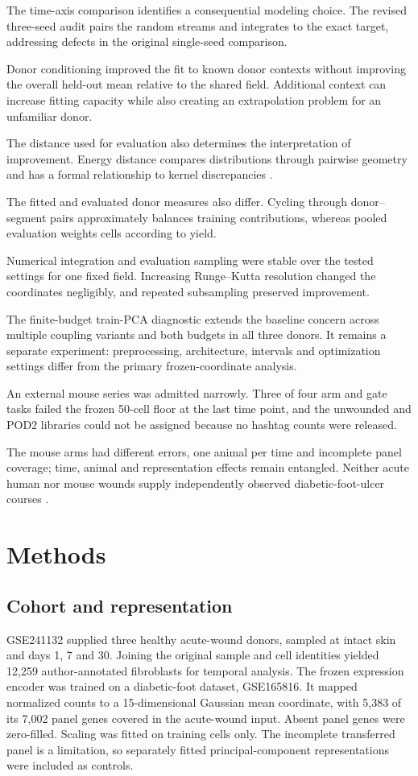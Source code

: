 \documentclass[10pt,a4paper]{article}
\begin{document}
The time-axis comparison identifies a consequential modeling choice. The revised three-seed audit pairs the random streams and integrates to the exact target, addressing defects in the original single-seed comparison.

Donor conditioning improved the fit to known donor contexts without improving the overall held-out mean relative to the shared field. Additional context can increase fitting capacity while also creating an extrapolation problem for an unfamiliar donor.

The distance used for evaluation also determines the interpretation of improvement. Energy distance compares distributions through pairwise geometry and has a formal relationship to kernel discrepancies \citep{szekely2013,sejdinovic2013}.

The fitted and evaluated donor measures also differ. Cycling through donor--segment pairs approximately balances training contributions, whereas pooled evaluation weights cells according to yield.

Numerical integration and evaluation sampling were stable over the tested settings for one fixed field. Increasing Runge--Kutta resolution changed the coordinates negligibly, and repeated subsampling preserved improvement.

The finite-budget train-PCA diagnostic extends the baseline concern across multiple coupling variants and both budgets in all three donors. It remains a separate experiment: preprocessing, architecture, intervals and optimization settings differ from the primary frozen-coordinate analysis.

An external mouse series was admitted narrowly. Three of four arm and gate tasks failed the frozen 50-cell floor at the last time point, and the unwounded and POD2 libraries could not be assigned because no hashtag counts were released.

The mouse arms had different errors, one animal per time and incomplete panel coverage; time, animal and representation effects remain entangled. Neither acute human nor mouse wounds supply independently observed diabetic-foot-ulcer courses \citep{armstrong2017}.


\section{Methods}
\subsection{Cohort and representation}
GSE241132 supplied three healthy acute-wound donors, sampled at intact skin and days 1, 7 and 30. Joining the original sample and cell identities yielded 12,259 author-annotated fibroblasts for temporal analysis. The frozen expression encoder was trained on a diabetic-foot dataset, GSE165816. It mapped normalized counts to a 15-dimensional Gaussian mean coordinate, with 5,383 of its 7,002 panel genes covered in the acute-wound input. Absent panel genes were zero-filled. Scaling was fitted on training cells only. The incomplete transferred panel is a limitation, so separately fitted principal-component representations were included as controls.
\end{document}
